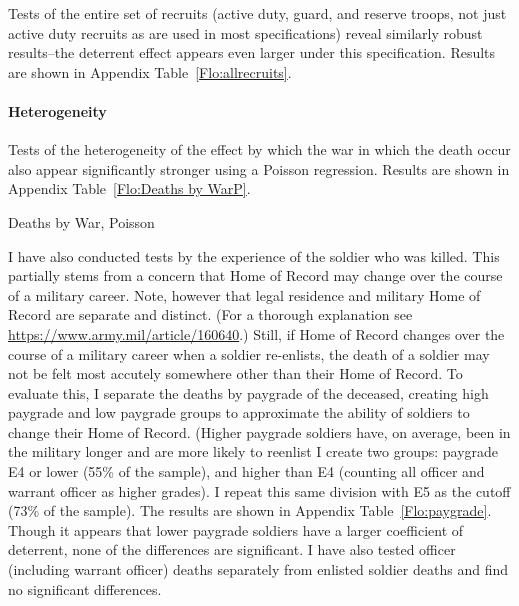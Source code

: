 \documentclass[12pt] {article}
\begin{document}
Tests of the entire set of recruits (active duty, guard, and reserve troops, not just active duty recruits as are used in most specifications) reveal similarly robust results--the deterrent effect appears even larger under this specification. Results are shown in Appendix Table~\ref{Flo:allrecruits}.

\begin{table}
\caption{}
\label{Flo:allrecruits}
\scalebox{0.8}{
}
\end{table}

\paragraph {Heterogeneity}
Tests of the heterogeneity of the effect by which the war in which the death occur also appear significantly stronger using a Poisson regression. Results are shown in Appendix Table~\ref{Flo:Deaths by WarP}.

\begin{table}
\caption{Deaths by War, Poisson}
\label{Flo:Deaths by WarP}

\end{table}

I have also conducted tests by the experience of the soldier who was killed. This partially stems from a concern that Home of Record may change over the course of a military career. Note, however that legal residence and military Home of Record are separate and distinct. (For a thorough explanation see \url{https://www.army.mil/article/160640}.) Still, if Home of Record changes over the course of a military career when a soldier re-enlists, the death of a soldier may not be felt most accutely somewhere other than their Home of Record. To evaluate this, I separate the deaths by paygrade of the deceased, creating high paygrade and low paygrade groups to approximate the ability of soldiers to change their Home of Record. (Higher paygrade soldiers have, on average, been in the military longer and are more likely to reenlist  I create two groups: paygrade E4 or lower (55\% of the sample), and higher than E4 (counting all officer and warrant officer as higher grades). I repeat this same division with E5 as the cutoff (73\% of the sample). The results are shown in Appendix Table~\ref{Flo:paygrade}. Though it appears that lower paygrade soldiers have a larger coefficient of deterrent, none of the differences are significant. I have also tested officer (including warrant officer) deaths separately from enlisted soldier deaths and find no significant differences.
\end{document}
